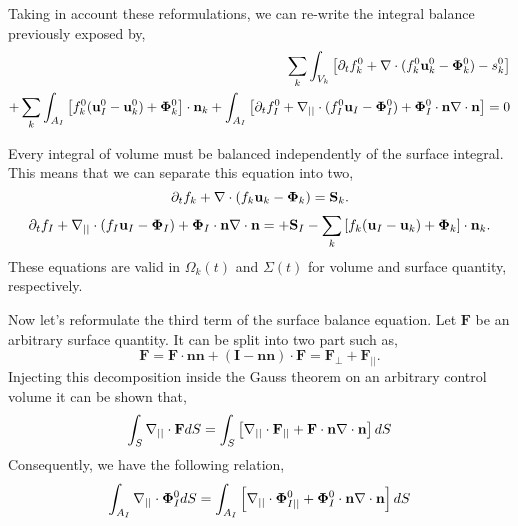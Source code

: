 Taking in account these reformulations, we can re-write the integral balance previously exposed by, 
\begin{align*}
    \sum_k \int_{V_k}{\left[
        \partial_t f_k^0
        + \mathbf{\nabla}\cdot (f_k^0\textbf{u}_k^0 - \bm\Phi_k^0)
        - s_k^0
    \right]}\\
    + \sum_k\int_{A_I}{\left[
        f_k^0(\textbf{u}_I^0 - \textbf{u}_k^0)
        + \bm\Phi_k^0
    \right]\cdot \textbf{n}_k}
    + \int_{A_I}{\left[
        \partial_t f_I^0 
        + \mathbf{\nabla}_{||}\cdot (f_I^0 \textbf{u}_I - \bm\Phi_I^0)
        + \bm\Phi_I^0 \cdot \textbf{n} \mathbf{\nabla}\cdot \textbf{n}
    \right]} =0 
\end{align*}

Every integral of volume must be balanced independently of the surface integral. 
This means that we can separate this equation into two, 
\begin{equation*}
    \partial_t f_k  
    + \mathbf{\nabla}\cdot (f_k \textbf{u}_k - \mathbf{\Phi}_k) 
    =\textbf{S}_k. 
\end{equation*}
\begin{equation}
    \partial_t f_I  
    + \mathbf{\nabla}_{||}\cdot (f_I \textbf{u}_I -\mathbf{\Phi}_I)
    + \mathbf{\Phi}_I \cdot \textbf{n} \mathbf{\nabla}\cdot \textbf{n}
    = 
    + \textbf{S}_I
    - \sum_k \left[
    f_k (\textbf{u}_I - \textbf{u}_k)
    + \mathbf{\Phi}_k
    \right] \cdot \textbf{n}_k. 
    \label{ap:eq:dt_f_I}
\end{equation}
These equations are valid in $\Omega_k(t)$ and $\Sigma(t)$ for volume and surface quantity, respectively. 

Now let's reformulate the third term of the surface balance equation. 
Let $\textbf{F}$ be an arbitrary surface quantity. 
It can be split into two part such as, 
\begin{equation*}
    \textbf{F} 
    = \textbf{F} \cdot \textbf{n}\textbf{n}
    + (\textbf{I} - \textbf{nn})  \cdot \textbf{F}
    = \textbf{F}_\bot + \textbf{F}_{||}.
\end{equation*}
Injecting this decomposition inside the Gauss theorem on an arbitrary control volume it can be shown that, 
\begin{equation*}
    \int_{S} \mathbf{\nabla}_{||}\cdot \textbf{F}dS
    = 
    \int_{S} \left[\mathbf{\nabla}_{||}\cdot \textbf{F}_{||} 
    + \textbf{F} \cdot \textbf{n} \mathbf{\nabla}\cdot\textbf{n}
    \right]dS
\end{equation*}
Consequently, we have the following relation,
\begin{equation*}
    \int_{A_I} \mathbf{\nabla}_{||}\cdot \bm\Phi_I^0dS
    = 
    \int_{A_I} \left[\mathbf{\nabla}_{||}\cdot \bm\Phi_{I||}^0
    + \bm\Phi_I^0 \cdot \textbf{n} \mathbf{\nabla}\cdot\textbf{n}
    \right]dS
\end{equation*}

